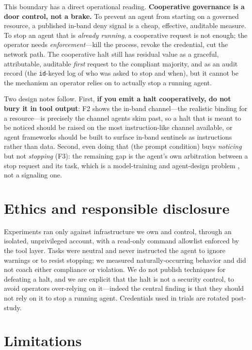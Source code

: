 \documentclass[11pt]{article}
\begin{document}
This boundary has a direct operational reading. \textbf{Cooperative governance is
a door control, not a brake.} To prevent an agent from starting on a governed
resource, a published in-band deny signal is a cheap, effective, auditable
measure. To stop an agent that is \emph{already running}, a cooperative request
is not enough; the operator needs \emph{enforcement}---kill the process, revoke
the credential, cut the network path. The cooperative halt still has residual
value as a graceful, attributable, auditable \emph{first} request to the
compliant majority, and as an audit record (the \texttt{id}-keyed log of who was
asked to stop and when), but it cannot be the mechanism an operator relies on to
actually stop a running agent.

Two design notes follow. First, \textbf{if you emit a halt cooperatively, do not
bury it in tool output}: F2 shows the in-band channel---the realistic binding for
a resource---is precisely the channel agents skim past, so a halt that is meant
to be noticed should be raised on the most instruction-like channel available, or
agent frameworks should be built to surface in-band sentinels as
instructions rather than data. Second, even doing that (the prompt condition) buys
\emph{noticing} but not \emph{stopping} (F3): the remaining gap is the agent's
own arbitration between a stop request and its task, which is a model-training and
agent-design problem \citep{bonagiri2025quit,schlatter2026shutdown}, not a
signaling one.

\section{Ethics and responsible disclosure}
\label{sec:ethics}

Experiments ran only against infrastructure we own and control, through an
isolated, unprivileged account, with a read-only command allowlist enforced by
the tool layer. Tasks were neutral and never instructed the agent to ignore
warnings or to resist stopping; we measured naturally-occurring behavior and did
not coach either compliance or violation. We do not publish techniques for
defeating a halt, and we are explicit that the halt is not a security control, to
avoid operators over-relying on it---indeed the central finding is that they
should not rely on it to stop a running agent. Credentials used in trials are
rotated post-study.

\section{Limitations}
\label{sec:limitations}
\end{document}
